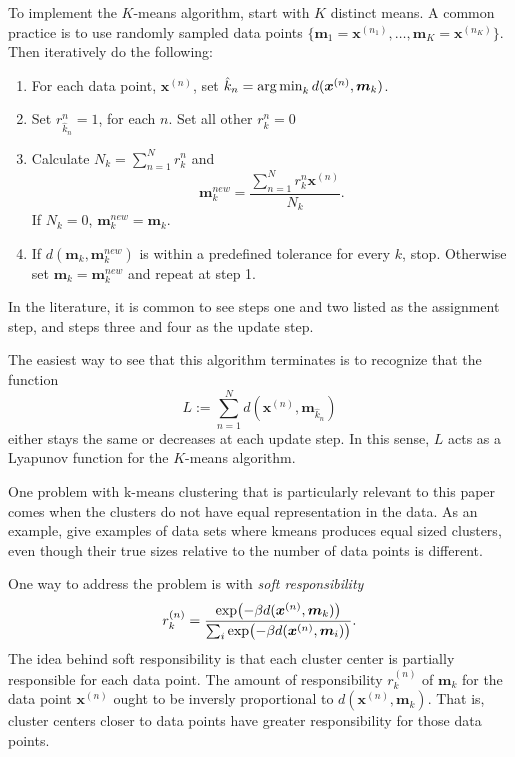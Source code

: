 To implement the \(K\)-means algorithm, start with \(K\) distinct means.  
A common practice is to use randomly sampled data points 
\(\{\bm m_1 = \bm x^{(n_1)},\ldots,\bm m_K = \bm x^{(n_K)}\}\). Then iteratively 
do the following:
\begin{enumerate}
	\item For each data point, \(\bm x^{(n)}\), set 
	\(\hat{k}_n = \operatorname*{arg\,min}_k d(\bm x^{(n)},\bm m_k)\).
	\item Set \(r_{\hat{k}_n}^{n} = 1\), for each \(n\). Set all other 
	\(r_k^n = 0\)
	\item Calculate \(N_k = \sum_{n=1}^{N} r^n_k\) and 
	\[\bm m_k^{new} = \frac{\sum_{n=1}^{N} r_k^n \bm x^{(n)}}{N_k}.\]
	If \(N_k = 0\), \(\bm m_k^{new} = \bm m_k\).
	\item If \(d(\bm m_k ,\bm m_k^{new})\) is within a predefined tolerance for every \( k \), 
	stop.  Otherwise set \(\bm m_k = \bm m_k^{new}\) and repeat at step 1.
\end{enumerate}
In the literature, it is common to see steps one and two listed as the 
assignment step, and steps three and four as the update step.  

The easiest way to see that this algorithm terminates is to recognize that the 
function \[L := \sum_{n=1}^{N} d(\bm x^{(n)},\bm m_{\hat{k}_n})\]
either stays the same or decreases at each update step.  In this sense, \(L\) 
acts as a Lyapunov function for the \(K\)-means algorithm.

One problem with k-means clustering that is particularly relevant to this 
paper comes when the clusters do not have equal representation in the data.
As an example, \cite{xiong2009kmeansvalid} give examples of data sets where kmeans produces equal sized clusters, even though their true sizes relative to the number of data points is different. %

One way to address the problem is with \textit{soft responsibility} 
\begin{equation}\label{softResp}
r_k^{(n)} = \frac{\exp(-\beta d(\bm x^{(n)},\bm m_k))}
{\sum_i \exp(-\beta d(\bm x^{(n)},\bm m_i))}.
\end{equation}
The idea behind soft responsibility is that each cluster center is partially 
responsible for each data point.  The amount of responsibility \(r_k^{(n)}\) 
of \(\bm m_k\) for the data point \(\bm x^{(n)}\) ought to be inversly 
proportional to \(d(\bm x^{(n)},\bm m_k)\). That is, cluster centers closer to 
data points have greater responsibility for those data points.  

